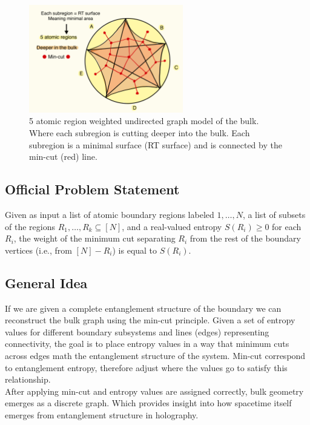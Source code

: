 \documentclass[12pt]{article}
\begin{document}
\begin{figure}[htbp]  %
    \centering
    \includegraphics[width=0.6\textwidth, height=0.23\textheight]{mincut_graph.jpeg}  %
    \caption{5 atomic region weighted undirected graph model of the bulk. Where each subregion is cutting deeper into the bulk. Each subregion is a minimal surface (RT surface) and is connected by the min-cut (red) line.}  %
    \label{fig:mincut}  %
\end{figure}

\subsection{Official Problem Statement}
\hspace{0.5cm} Given as input a list of atomic boundary regions labeled \( 1, \dots, N \), a list of subsets of the regions \( R_1, \dots, R_k \subseteq [N] \), and a real-valued entropy \( S(R_i) \geq 0 \) for each \( R_i \), the weight of the minimum cut separating \( R_i \) from the rest of the boundary vertices (i.e., from \( [N] - R_i \)) is equal to \( S(R_i) \).


\subsection{General Idea}
\hspace{0.5cm} If we are given a complete entanglement structure of the boundary we can reconstruct the bulk graph using the min-cut principle. Given a set of entropy values for different boundary subsystems and lines (edges) representing connectivity, the goal is to place entropy values in a way that minimum cuts across edges math the entanglement structure of the system. Min-cut correspond to entanglement entropy, therefore adjust where the values go to satisfy this relationship.
\\
\indent After applying min-cut and entropy values are assigned correctly, bulk geometry emerges as a discrete graph. Which provides insight into how spacetime itself emerges from entanglement structure in holography. 
\end{document}
